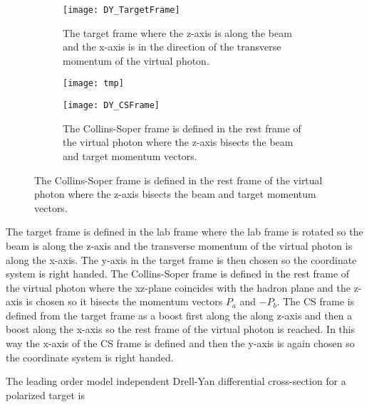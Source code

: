 \begin{figure}[h!t]
  \centering
  \begin{subfigure}{.46\textwidth}
    \centering
    \texttt{[image: DY\_TargetFrame]}
    \caption{The target frame where the z-axis is along the beam and the x-axis
      is in the direction of the transverse momentum of the virtual photon.}
    \label{fig::DY_TargetFrame}%
  \end{subfigure}
  \begin{subfigure}{.02\textwidth}
    \centering
    \texttt{[image: tmp]}
    \label{fig::tmp1}%
  \end{subfigure}
  \begin{subfigure}{.46\textwidth}
    \centering
    \texttt{[image: DY\_CSFrame]}
    \caption{The Collins-Soper frame is defined in the rest frame of the virtual
      photon where the z-axis bisects the beam and target momentum vectors.}
    \label{fig::DY_CSFrame}%
  \end{subfigure}
\end{figure}

The target frame is defined in the lab frame where the lab frame is rotated so
the beam is along the z-axis and the transverse momentum of the virtual photon
is along the x-axis.  The y-axis in the target frame is then chosen so the
coordinate system is right handed.  The Collins-Soper frame is defined in the
rest frame of the virtual photon where the xz-plane coincides with the hadron
plane and the z-axis is chosen so it bisects the momentum vectors $P_a$ and
$-P_b$.  The CS frame is defined from the target frame as a boost first along
the along z-axis and then a boost along the x-axis so the rest frame of the
virtual photon is reached.  In this way the x-axis of the CS frame is defined
and then the y-axis is again chosen so the coordinate system is right handed.

The leading order model independent Drell-Yan differential cross-section for a
polarized target is~\cite{DYxSection,AKotzininaNote}

